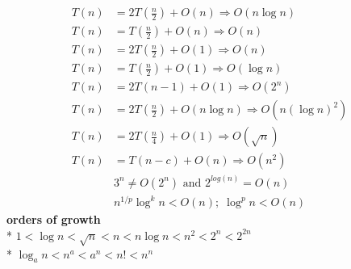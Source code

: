 \documentclass[10pt, landscape]{article}
\newenvironment{tightcenter}{%
  \setlength\topsep{0pt}
  \setlength\parskip{0pt}
  \begin{center}
}{%
  \end{center}
}
\let\then\rightarrow
\begin{document}
\begin{multicols}{4}
\begin{tightcenter}
\begin{align*}
    T(n) &= 2T(\frac{n}{2}) + O(n) \Rightarrow O(n \log n)
    \\ T(n) &= T(\frac{n}{2}) + O(n) \Rightarrow O(n)
    \\ T(n) &= 2T(\frac{n}{2}) + O(1) \Rightarrow O(n)
    \\ T(n) &= T(\frac{n}{2}) + O(1) \Rightarrow O(\log n)
    \\ T(n) &= 2T(n - 1) + O(1) \Rightarrow O(2^n)
    \\ T(n) &= 2T(\frac{n}{2}) + O(n \log n) \Rightarrow O(n(\log n)^2)
    \\ T(n) &= 2T(\frac{n}{4}) + O(1) \Rightarrow O(\sqrt{n})
    \\ T(n) &= T(n - c) + O(n) \Rightarrow O(n^2)
    \\ & 3^n \neq O(2^n) \text{ and } 2^{log(n)} = O(n)
    \\ & n^{1/p} \log^k n < O(n); \; \log^p n < O(n)
\end{align*}
\textbf{orders of growth}
\\* $1 < \log n < \sqrt{n} < n < n \log n < n^2 < 2^n < 2^{2n}$
\\* $\log_a n < n^a < a^n < n! < n^n$ 
\end{tightcenter}

\end{multicols}
\end{document}
